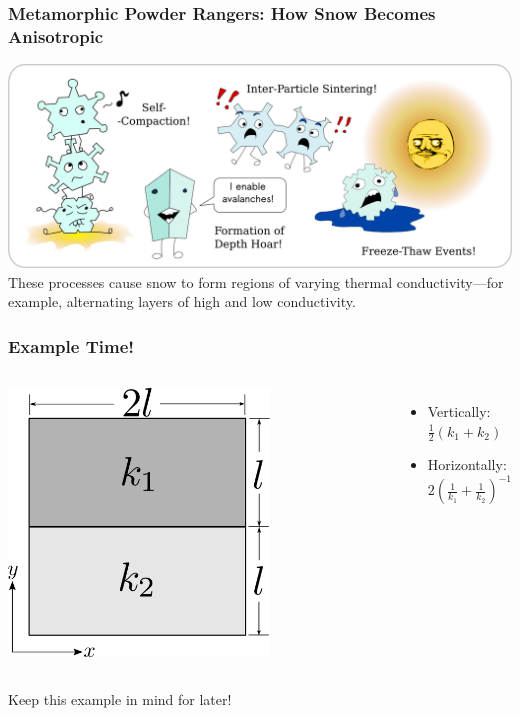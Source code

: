 \documentclass{beamer}
\begin{document}
\begin{frame}
\frametitle{Metamorphic Powder Rangers: How Snow Becomes Anisotropic}
\includegraphics[width=\textwidth]{fig/metamorphism.png}\\
These processes cause snow to form regions of varying thermal conductivity---for
example, alternating layers of high and low conductivity.
\end{frame}


\begin{frame}
\frametitle{Example Time!}
\begin{columns}[c]
    \centering
    \includegraphics[width=0.7\textwidth]{fig/ex_laminate.png}
    \begin{itemize}
    \item Vertically: \(\frac12(k_1 + k_2)\)
    \item Horizontally: \(2\left( \frac1{k_1} + \frac1{k_2} \right)^{-1}\)
    \end{itemize}
\end{columns}
\smallskip
Keep this example in mind for later!
\end{frame}
\end{document}

